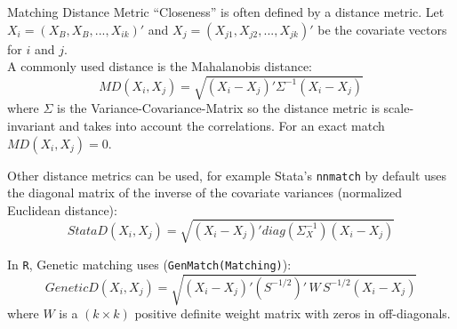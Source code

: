 \documentclass{beamer}
\numberwithin{equation}{section}
\begin{document}
\begin{frame}{Matching Distance Metric}
\scriptsize
``Closeness'' is often defined by a \alert{distance metric}. Let
$X_i=(X_B,X_B,...,X_{ik})'$ and $X_j=(X_{j1},X_{j2},...,X_{jk})'$
be the covariate vectors for $i$ and $j$.\\\medskip A commonly used distance is
the \alert{Mahalanobis distance}: \[
MD(X_i,X_j)=\sqrt{(X_i-X_j)'\Sigma^{-1}(X_i-X_j)}
\] where $\Sigma$ is the Variance-Covariance-Matrix so the distance metric is scale-invariant and takes into account the correlations. For an exact match
$MD(X_i,X_j)=0$. 

Other distance metrics can be used, for example Stata's \texttt{nnmatch} by default uses the diagonal matrix of the inverse of the covariate variances (normalized Euclidean distance):
\[
StataD(X_i,X_j)=\sqrt{(X_i-X_j)'diag(\Sigma_X^{-1})(X_i-X_j)}
\]

In \texttt{R}, Genetic matching uses (\texttt{GenMatch(Matching)}): \[
GeneticD(X_i,X_j) = \sqrt{(X_i - X_j)'(S^{-1/2})'\, W\, S^{-1/2} (X_i - X_j)}
\] where $W$ is a $(k \times k)$ positive definite weight matrix with
zeros in off-diagonals.

\end{frame}

%
%
%
%
%
\end{document}
